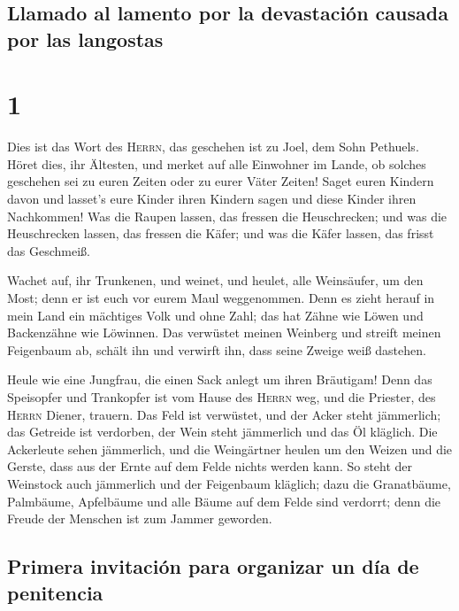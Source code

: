 \hypertarget{llamado-al-lamento-por-la-devastaciuxf3n-causada-por-las-langostas}{%
\subsection{Llamado al lamento por la devastación causada por las
langostas}\label{llamado-al-lamento-por-la-devastaciuxf3n-causada-por-las-langostas}}

\hypertarget{section}{%
\section{1}\label{section}}

 Dies ist das Wort des \textsc{Herrn}, das geschehen ist
zu Joel, dem Sohn Pethuels.  Höret dies, ihr Ältesten, und
merket auf alle Einwohner im Lande, ob solches geschehen sei zu euren
Zeiten oder zu eurer Väter Zeiten!  Saget euren Kindern
davon und lasset's eure Kinder ihren Kindern sagen und diese Kinder
ihren Nachkommen!  Was die Raupen lassen, das fressen die
Heuschrecken; und was die Heuschrecken lassen, das fressen die Käfer;
und was die Käfer lassen, das frisst das Geschmeiß.

 Wachet auf, ihr Trunkenen, und weinet, und heulet, alle
Weinsäufer, um den Most; denn er ist euch vor eurem Maul weggenommen.
 Denn es zieht herauf in mein Land ein mächtiges Volk und
ohne Zahl; das hat Zähne wie Löwen und Backenzähne wie Löwinnen.
 Das verwüstet meinen Weinberg und streift meinen
Feigenbaum ab, schält ihn und verwirft ihn, dass seine Zweige weiß
dastehen.

 Heule wie eine Jungfrau, die einen Sack anlegt um ihren
Bräutigam!  Denn das Speisopfer und Trankopfer ist vom
Hause des \textsc{Herrn} weg, und die Priester, des \textsc{Herrn}
Diener, trauern.  Das Feld ist verwüstet, und der Acker
steht jämmerlich; das Getreide ist verdorben, der Wein steht jämmerlich
und das Öl kläglich.  Die Ackerleute sehen jämmerlich,
und die Weingärtner heulen um den Weizen und die Gerste, dass aus der
Ernte auf dem Felde nichts werden kann.  So steht der
Weinstock auch jämmerlich und der Feigenbaum kläglich; dazu die
Granatbäume, Palmbäume, Apfelbäume und alle Bäume auf dem Felde sind
verdorrt; denn die Freude der Menschen ist zum Jammer geworden.

\hypertarget{primera-invitaciuxf3n-para-organizar-un-duxeda-de-penitencia}{%
\subsection{Primera invitación para organizar un día de
penitencia}\label{primera-invitaciuxf3n-para-organizar-un-duxeda-de-penitencia}}

